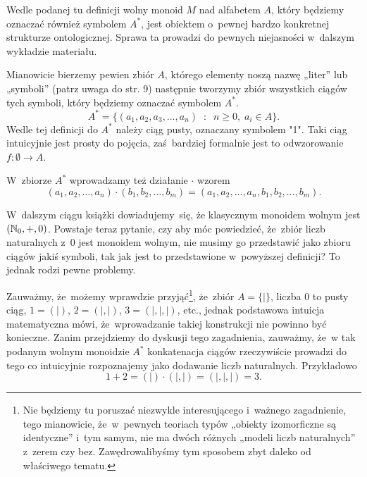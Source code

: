 \documentclass[a4paper,11pt]{article}
\begin{document}
\vspace{\spaceFour}



\start {} Wedle podanej tu definicji wolny monoid $M$ nad
alfabetem $A$, który będziemy oznaczać również symbolem $A^{ * }$,
jest obiektem o~pewnej bardzo konkretnej strukturze ontologicznej.
Sprawa ta prowadzi do pewnych niejasności w~dalszym wykładzie materiału.

Mianowicie bierzemy pewien zbiór $A$, którego elementy noszą nazwę „liter” lub „symboli” (patrz uwaga do str. 9) następnie tworzymy zbiór wszystkich ciągów tych symboli, który będziemy oznaczać symbolem $A^{ * }$.
\begin{equation}
  \label{eq:Forys-Forys-01}
  A^{ * } =
  \{ ( a_{ 1 }, a_{ 2 }, a_{ 3 }, \ldots, a_{ n } ) \;\; : \;\; n \geq 0, \;
  a_{ i } \in A \}.
\end{equation}
Wedle tej definicji do $A^{ * }$ należy ciąg pusty, oznaczany symbolem
\textrm{"1"}. Taki ciąg intuicyjnie jest prosty do pojęcia, zaś~bardziej
formalnie jest to odwzorowanie $f : \emptyset \to A$.

W~zbiorze $A^{ * }$ wprowadzamy też działanie $\cdot$ wzorem
\begin{equation}
  \label{eq:Froys-Forys-02}
  ( a_{ 1 }, a_{ 2 }, \ldots, a_{ n } ) \cdot ( b_{ 1 }, b_{ 2 }, \ldots, b_{ m } ) =
  ( a_{ 1 }, a_{ 2 }, \ldots, a_{ n }, b_{ 1 }, b_{ 2 }, \ldots, b_{ m } ).
\end{equation}

W~dalszym ciągu książki dowiadujemy~się, że klasycznym monoidem wolnym jest
$( \mathbb{N}_{ 0 }, +, 0 )$. Powstaje teraz pytanie, czy aby móc powiedzieć,
że~zbiór liczb naturalnych z~$0$ jest monoidem wolnym, nie musimy go
przedstawić jako zbioru ciągów jakiś symboli, tak jak jest to przedstawione
w~powyższej definicji? To jednak rodzi pewne problemy.

Zauważmy, że~możemy wprawdzie przyjąć\footnote{Nie będziemy tu poruszać
  niezwykle interesującego i~ważnego zagadnienie, tego mianowicie,
  że~w~pewnych teoriach typów „obiekty izomorficzne są identyczne” i~tym
  samym, nie ma dwóch różnych „modeli liczb naturalnych” z~zerem czy bez.
  Zawędrowalibyśmy tym sposobem zbyt daleko od właściwego tematu.}, że~zbiór
$A = \{ | \}$, liczba $0$ to pusty ciąg, $1 = ( | )$, $2 = ( |, | )$,
$3 = ( |, |, | )$, etc., jednak podstawowa intuicja matematyczna mówi,
że~wprowadzanie takiej konstrukcji nie powinno być konieczne. Zanim
przejdziemy do dyskusji tego zagadnienia, zauważmy, że~w tak podanym wolnym
monoidzie $A^{ * }$ konkatenacja ciągów rzeczywiście prowadzi do tego co
intuicyjnie rozpoznajemy jako dodawanie liczb naturalnych. Przykładowo
\begin{equation}
  \label{eq:Forys-Forys-03}
  1 + 2 = ( | ) \cdot ( |, | ) = ( |, |, | ) = 3.
\end{equation}
\end{document}
